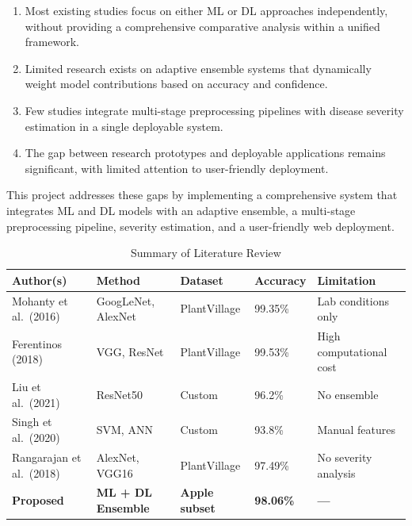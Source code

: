 \documentclass[12pt]{report}
\begin{document}
\begin{enumerate}[leftmargin=*]
\item Most existing studies focus on either ML or DL approaches independently, without providing a comprehensive comparative analysis within a unified framework.
\item Limited research exists on adaptive ensemble systems that dynamically weight model contributions based on accuracy and confidence.
\item Few studies integrate multi-stage preprocessing pipelines with disease severity estimation in a single deployable system.
\item The gap between research prototypes and deployable applications remains significant, with limited attention to user-friendly deployment.
\end{enumerate}

This project addresses these gaps by implementing a comprehensive system that integrates ML and DL models with an adaptive ensemble, a multi-stage preprocessing pipeline, severity estimation, and a user-friendly web deployment.

\begin{table}[H]
\centering
\caption{Summary of Literature Review}
\label{tab:lit_summary}
\begin{tabular}{|p{2.5cm}|p{3cm}|p{2.5cm}|p{2cm}|p{3cm}|}
\hline
\textbf{Author(s)} & \textbf{Method} & \textbf{Dataset} & \textbf{Accuracy} & \textbf{Limitation} \\
\hline
Mohanty et al.\ (2016) & GoogLeNet, AlexNet & PlantVillage & 99.35\% & Lab conditions only \\
\hline
Ferentinos (2018) & VGG, ResNet & PlantVillage & 99.53\% & High computational cost \\
\hline
Liu et al.\ (2021) & ResNet50 & Custom & 96.2\% & No ensemble \\
\hline
Singh et al.\ (2020) & SVM, ANN & Custom & 93.8\% & Manual features \\
\hline
Rangarajan et al.\ (2018) & AlexNet, VGG16 & PlantVillage & 97.49\% & No severity analysis \\
\hline
\textbf{Proposed} & \textbf{ML + DL Ensemble} & \textbf{Apple subset} & \textbf{98.06\%} & \textbf{---} \\
\hline
\end{tabular}
\end{table}
\end{document}
